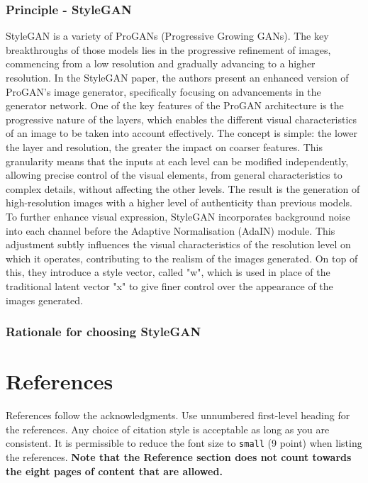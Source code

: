 \documentclass{article}
\begin{document}
\subsubsection*{Principle - StyleGAN}
StyleGAN is a variety of ProGANs (Progressive Growing GANs). The key breakthroughs of those models lies in the progressive refinement of images, commencing from a low resolution and gradually advancing to a higher resolution. In the StyleGAN paper, the authors present an enhanced version of ProGAN's image generator, specifically focusing on advancements in the generator network.
One of the key features of the ProGAN architecture is the progressive nature of the layers, which enables the different visual characteristics of an image to be taken into account effectively. The concept is simple: the lower the layer and resolution, the greater the impact on coarser features. This granularity means that the inputs at each level can be modified independently, allowing precise control of the visual elements, from general characteristics to complex details, without affecting the other levels. The result is the generation of high-resolution images with a higher level of authenticity than previous models.
To further enhance visual expression, StyleGAN incorporates background noise into each channel before the Adaptive Normalisation (AdaIN) module. This adjustment subtly influences the visual characteristics of the resolution level on which it operates, contributing to the realism of the images generated.
On top of this, they introduce a style vector, called "w", which is used in place of the traditional latent vector "x" to give finer control over the appearance of the images generated.

\subsubsection*{Rationale for choosing StyleGAN}

\section*{References}

References follow the acknowledgments. Use unnumbered first-level heading for
the references. Any choice of citation style is acceptable as long as you are
consistent. It is permissible to reduce the font size to \verb+small+ (9 point)
when listing the references.
{\bf Note that the Reference section does not count towards the eight pages of content that are allowed.}
\medskip
\end{document}

